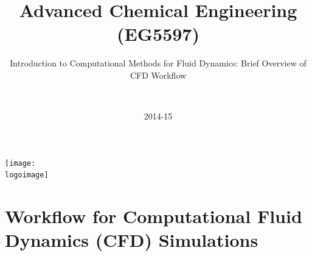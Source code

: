 \documentclass[10pt,compress]{beamer}
\institute{School of Engineering}
\title{Advanced Chemical Engineering (EG5597)}
\subtitle{Introduction to Computational Methods for Fluid Dynamics: Brief Overview of CFD Workflow}
\date[2014-15]{2014-15}
\author[\shortname]{%
  \fullname\\\ttfamily{\emailaddress}
}
\newcommand{\logoimage}{./FigBanner/UoAHorizBanner}
\begin{document}
\begin{frame}
  \titlepage
  \vfill%
  \begin{center}
    \texttt{[image: \\logoimage]}
  \end{center}
\end{frame}






\section{Workflow for Computational Fluid Dynamics (CFD) Simulations}

\end{document}
